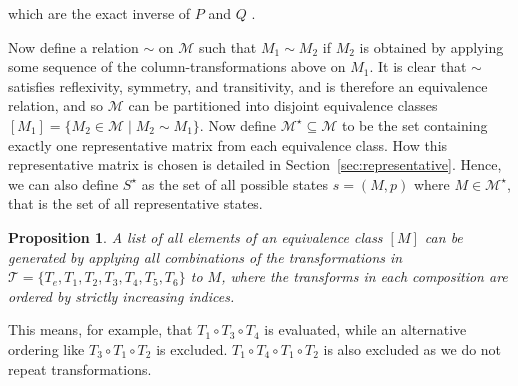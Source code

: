 \documentclass{article}
\newtheorem{proposition}{Proposition}
\begin{document}
which are the exact inverse of $P$ and $Q$ \cite[p.~18]{dummit04}.

Now define a relation $\sim$ on $\mathcal{M}$ such that $M_1 \sim M_2$ if $M_2$
is obtained by applying some sequence of the column-transformations above on
$M_1$.
It is clear that $\sim$ satisfies reflexivity, symmetry, and transitivity, and
is therefore an equivalence relation, and so $\mathcal{M}$ can be partitioned
into disjoint equivalence classes
$[M_1] = \{M_2 \in \mathcal{M} \mid M_2 \sim M_1\}$.
Now define $\mathcal{M}^{\star} \subseteq \mathcal{M}$ to be the set containing
exactly one representative matrix from each equivalence class.
How this representative matrix is chosen is detailed in
Section~\ref{sec:representative}.
Hence, we can also define $S^{\star}$ as the set of all possible states
$s = (M, p)$ where $M \in \mathcal{M}^{\star}$, that is the set of all
representative states.

\begin{proposition}\label{thrm:generate_equivalence_classes}
A list of all elements of an equivalence class $[M]$ can be generated by
applying all combinations of the transformations in
$\mathcal{T} = \{T_e, T_1, T_2, T_3, T_4, T_5, T_6\}$ to $M$, where the
transforms in each composition are ordered by strictly increasing indices.
\end{proposition}

This means, for example, that $T_1 \circ T_3 \circ T_4$ is evaluated, while an
alternative ordering like $T_3 \circ T_1 \circ T_2$ is excluded.
$T_1 \circ T_4 \circ T_1 \circ T_2$ is also excluded as we do not repeat
transformations.
\end{document}
